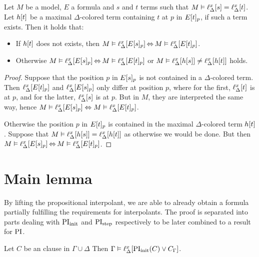 \begin{lemma}
	\label{aga5tg5ba}
	Let $M$ be a model, $E$ a formula and $s$ and $t$ terms such that
	$M \vDash \ell_{\Delta}^{x}[s] = \ell_{\Delta}^{x}[t]$.
	Let $h[t]$ be a maximal $\Delta$-colored term containing $t$ at $p$ in $E{[t]_{p}}$, if such a term exists. Then it holds that:
	\begin{itemize}
		\item If $h[t]$ does not exists, then
			$M\vDash \ell_{\Delta}^{x}[E{[s]_{p}}] \operatorname{\Leftrightarrow} M \vDash \ell_{\Delta}^{x}[E{[t]_{p}}]$.
		\item Otherwise
			$M\vDash \ell_{\Delta}^{x}[E{[s]_{p}}] \operatorname{\Leftrightarrow} M \vDash \ell_{\Delta}^{x}[E{[t]_{p}}]$
			or $M\vDash \ell_{\Delta}^{x}[h[s]] \neq \ell_{\Delta}^{x}[h[t]]$ holds.
	\end{itemize}
\end{lemma}
\begin{proof} 
	Suppose that the position $p$ in $E{[s]_{p}}$ is not contained in a $\Delta$-colored term.
	Then $\ell_{\Delta}^{x}[E{[t]_{p}}]$ and $\ell_{\Delta}^{x}[E{[s]_{p}}]$ only differ at position $p$,
	where for the first, $\ell_{\Delta}^{x}[t]$ is at $p$, and for the latter, $\ell_{\Delta}^{x}[s]$ is at $p$.
	But in $M$, they are interpreted the same way, hence $M\entails\nolinebreak \lifdelta{E\occurat{s}{p}} \spas\semiff M \entails \lifdelta{E\occurat{t}{p}}$.

	Otherwise the position $p$ in $E{[t]_{p}}$ is contained in the maximal $\Delta$-colored term $h[t]$.
	Suppose that $M\vDash \ell_{\Delta}^{x}[h[s]]  = \ell_{\Delta}^{x}[h[t]]$ as otherwise we would be done.
	But then $M \entails\nolinebreak \lifdelta{E\occurat{s}{p}} \semiff{} M\entails \lifdelta{E\occurat{t}{p}}$.
\end{proof} 


\section{Main lemma}
\label{sec:two_phase_main_lemma}

By lifting the propositional interpolant, we are able to already obtain a formula partially fulfilling the requirements for interpolants.
The proof is separated into parts dealing with $\operatorname{PI}_{\mathrm{init}}$ and $\operatorname{PI}_{\mathrm{step}}$ respectively to be later combined to a result for $\operatorname{PI}$.


\begin{lemma}
	Let $C$ be an clause in $\Gamma \cup \Delta$ 
	Then $\Gamma \entails \lifdelta{\PIinit(C) \lor\nolinebreak C_\Gamma} $.
\end{lemma}




